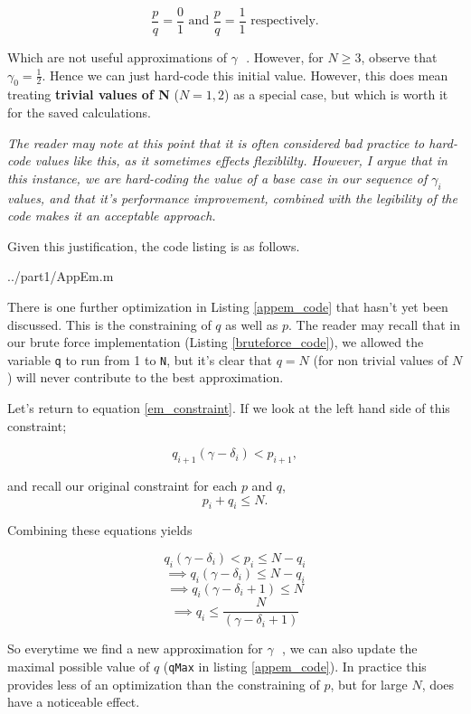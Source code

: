 \documentclass[10pt]{article}
\newcommand*{\gam}{$\gamma \text{ }$}
\newcommand*{\gami}{$\gamma_{i}$}
\begin{document}
$$ \frac{p}{q} = \frac{0}{1} \text{  and  }  \frac{p}{q} = \frac{1}{ 1} \text{ respectively}. $$

Which are not useful approximations of \gam.
 However, for $N \geq 3$, observe that $\gamma_0 = \frac{1}{2}$. Hence we can just hard-code this initial value. However, this does mean treating \textbf{trivial values of N} ($N = 1,2$) as a special case, but which is worth it for the saved calculations.

\emph{The reader may note at this point that it is often considered bad practice to hard-code values like this, as it sometimes effects flexiblilty. However, I argue that in this instance, we are hard-coding the value of a base case in our sequence of \gami $ $ values, and that it's performance improvement, combined with the legibility of the code makes it an acceptable approach.}

Given this justification, the code listing is as follows.

   {../part1/AppEm.m}

There is one further optimization in Listing \ref{appem_code} that hasn't yet been discussed. This is the constraining of $q$ as well as $p$. The reader may recall that in our brute force implementation (Listing \ref{bruteforce_code}), we allowed the variable \texttt{q} to run from 1 to \texttt{N}, but it's clear that $q = N$ (for non trivial values of $N$) will never contribute to the best approximation.

Let's return to equation \ref{em_constraint}. If we look at the left hand side of this constraint;

$$q_{i+1} (\gamma - \delta_i) < p_{i+1} ,$$

and recall our original constraint for each $p$ and $q$,
$$ p_i + q_i \leq N .$$

Combining these equations yields

$$ q_i (\gamma - \delta_i) < p_i \leq N - q_i $$ 
$$ \implies  q_i (\gamma - \delta_i) \leq N - q_i $$ 
$$ \implies q_i (\gamma - \delta_i + 1) \leq N  $$ 
$$ \implies q_i  \leq \frac{N}{(\gamma - \delta_i + 1)}  $$ 

So everytime we find a new approximation for \gam, we can also update the maximal possible value of $q$ (\texttt{qMax} in listing \ref{appem_code}). In practice this provides less of an optimization than the constraining of $p$, but for large $N$, does have a noticeable effect.
\end{document}
